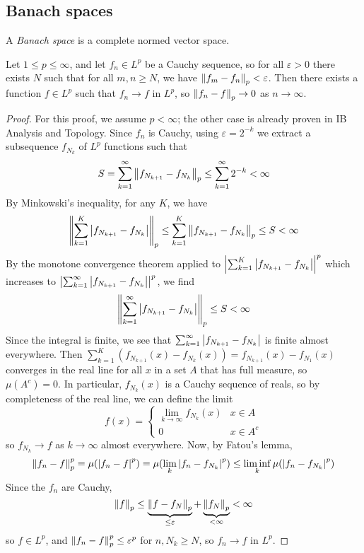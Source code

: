 \subsection{Banach spaces}
\begin{definition}
	A \emph{Banach space} is a complete normed vector space.
\end{definition}
\begin{theorem}
	Let \( 1 \leq p \leq \infty \), and let \( f_n \in L^p \) be a Cauchy sequence, so for all \( \varepsilon > 0 \) there exists \( N \) such that for all \( m, n \geq N \), we have \( \norm{f_m - f_n}_p < \varepsilon \).
	Then there exists a function \( f \in L^p \) such that \( f_n \to f \) in \( L^p \), so \( \norm{f_n - f}_p \to 0 \) as \( n \to \infty \).
\end{theorem}
\begin{proof}
	For this proof, we assume \( p < \infty \); the other case is already proven in IB Analysis and Topology.
	Since \( f_n \) is Cauchy, using \( \varepsilon = 2^{-k} \) we extract a subsequence \( f_{N_k} \) of \( L^p \) functions such that
	\[ S = \sum_{k=1}^\infty \norm{f_{N_{k+1}} - f_{N_k}}_p \leq \sum_{k=1}^\infty 2^{-k} < \infty \]
	By Minkowski's inequality, for any \( K \), we have
	\[ \norm{\sum_{k=1}^K \abs{f_{N_{k+1}} - f_{N_k}}}_p \leq \sum_{k=1}^K \norm{f_{N_{k+1}} - f_{N_k}}_p \leq S < \infty \]
	By the monotone convergence theorem applied to \( \abs{\sum_{k=1}^K \abs{f_{N_{k+1}} - f_{N_k}}}^p \) which increases to \( \abs{\sum_{k=1}^\infty \abs{f_{N_{k+1}} - f_{N_k}}}^p \), we find
	\[ \norm{\sum_{k=1}^\infty \abs{f_{N_{k+1}} - f_{N_k}}}_p \leq S < \infty \]
	Since the integral is finite, we see that \( \sum_{k=1}^\infty \abs{f_{N_{k+1}} - f_{N_k}} \) is finite almost everywhere.
	Then \( \sum_{k=1}^K (f_{N_{k+1}}(x) - f_{N_k}(x)) = f_{N_{k+1}}(x) - f_{N_1}(x) \) converges in the real line for all \( x \) in a set \( A \) that has full measure, so \( \mu(A^c) = 0 \).
	In particular, \( f_{N_k}(x) \) is a Cauchy sequence of reals, so by completeness of the real line, we can define the limit
	\[ f(x) = \begin{cases}
		\lim_{k \to \infty} f_{N_k}(x) & x \in A \\
		0 & x \in A^c
	\end{cases} \]
	so \( f_{N_k} \to f \) as \( k \to \infty \) almost everywhere.
	Now, by Fatou's lemma,
	\[ \norm{f_n - f}_p^p = \mu(\abs{f_n - f}^p) = \mu(\lim_k \abs{f_n - f_{N_k}}^p) \leq \liminf_k \mu(\abs{f_n - f_{N_k}}^p) \]
	Since the \( f_n \) are Cauchy,
	\[ \norm{f}_p \leq \underbrace{\norm{f - f_N}_p}_{\leq \varepsilon} + \underbrace{\norm{f_N}_p}_{< \infty} < \infty \]
	so \( f \in L^p \), and \( \norm{f_n - f}_p^p \leq \varepsilon^p \) for \( n, N_k \geq N \), so \( f_n \to f \) in \( L^p \).
\end{proof}
